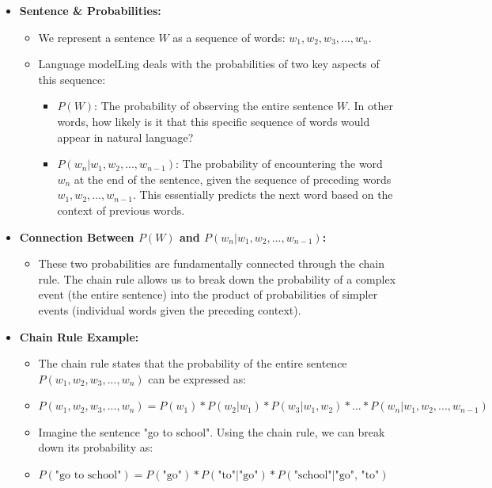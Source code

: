 \documentclass[12pt]{article}
\begin{document}
    \begin{itemize}
        \item \textbf{Sentence \& Probabilities:}
        \begin{itemize}
            \item We represent a sentence $W$ as a sequence of words: $w_1, w_2, w_3, ..., w_n$.
            \item Language modelLing deals with the probabilities of two key aspects of this sequence:
            \begin{itemize}
                \item $P(W)$: The probability of observing the entire sentence $W$. In other words, how likely is it that this specific sequence of words would appear in natural language?
                \item $P(w_n | w_1, w_2, ..., w_{n-1})$: The probability of encountering the word $w_n$ at the end of the sentence, given the sequence of preceding words $w_1, w_2, ..., w_{n-1}$. This essentially predicts the next word based on the context of previous words.
            \end{itemize}
        \end{itemize}
        \item \textbf{Connection Between $P(W)$ and $P(w_n | w_1, w_2, ..., w_{n-1})$:}
        \begin{itemize}
            \item These two probabilities are fundamentally connected through the chain rule. The chain rule allows us to break down the probability of a complex event (the entire sentence) into the product of probabilities of simpler events (individual words given the preceding context).
        \end{itemize}
        \item \textbf{Chain Rule Example:}
        \begin{itemize}
            \item The chain rule states that the probability of the entire sentence $P(w_1, w_2, w_3, ..., w_n)$ can be expressed as:
            \item $P(w_1, w_2, w_3, ..., w_n) = P(w_1) * P(w_2 | w_1) * P(w_3 | w_1, w_2) * ... * P(w_n | w_1, w_2, ..., w_{n-1})$
            \item Imagine the sentence "go to school". Using the chain rule, we can break down its probability as:
            \item $P(\text{"go to school"}) = P(\text{"go"}) * P(\text{"to"} | \text{"go"}) * P(\text{"school"} | \text{"go", "to"})$
        \end{itemize}
    \end{itemize}
\end{document}
